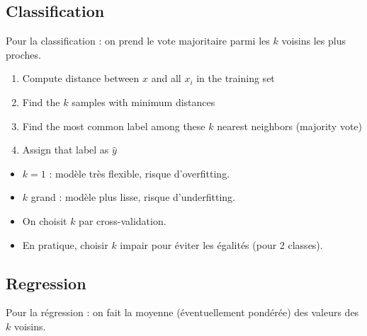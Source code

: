 \documentclass[11pt,a4paper,openany]{book}
\begin{document}
\vspace{0.8cm}

\subsection{Classification}

Pour la classification : on prend le vote majoritaire parmi les $k$ voisins les plus proches.

\vspace{0.5cm}

\begin{algbox}[title=KNN classification algorithm]
\begin{enumerate}
    \item Compute distance between $x$ and all $x_i$ in the training set

    \item Find the $k$ samples with minimum distances

    \item Find the most common label among these $k$ nearest neighbors (majority vote)

    \item Assign that label as $\hat{y}$
\end{enumerate}
\end{algbox}

\begin{rembox}[title=Choix de $k$]
\begin{itemize}
    \item $k = 1$ : modèle très flexible, risque d'overfitting.
    \item $k$ grand : modèle plus lisse, risque d'underfitting.
    \item On choisit $k$ par cross-validation.
    \item En pratique, choisir $k$ impair pour éviter les égalités (pour 2 classes).
\end{itemize}
\end{rembox}

\vspace{0.8cm}

\subsection{Regression}

Pour la régression : on fait la moyenne (éventuellement pondérée) des valeurs des $k$ voisins.

\vspace{0.5cm}
\end{document}
